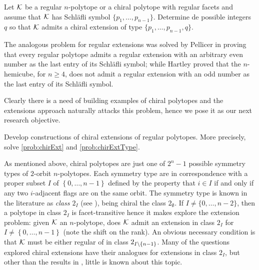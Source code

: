 \documentclass[a4paper,12pt,english]{article}
\begin{document}
\begin{problem} \label{prob:chirExtType}
  Let $\mathcal{K}$ be a regular $n$-polytope or a chiral polytope with regular facets and assume that $\mathcal{K}$ has Schläfli symbol $\{p_{1}, \dots, p_{n-1}\}$. Determine de possible integers $q$ so that $\mathcal{K}$ admits a chiral extension of type $\{p_{1}, \dots, p_{n-1}, q\}$.
\end{problem}


The analogous problem for regular extensions was solved by Pellicer in \cite{Pellicer2010_ExtensionsDuallyBipartite,Pellicer2009_ExtensionsRegularPolytopes} proving  that every regular polytope admits a regular extension with an arbitrary even number as the last entry of its Schläfli symbol; while Hartley proved that the $n$-hemicube, for $n \geq 4$, does not admit a regular extension with an odd number as the last entry of its Schläfli symbol.


Clearly there is a need of building examples of chiral polytopes and the extensions approach naturally attacks this problem, hence we pose it as our next research objective.

\begin{obj}\label{obj:chirExt}
  Develop constructions of chiral extensions of regular polytopes. 
  More precisely, solve \cref{prob:chirExt} and \cref{prob:chirExtType}.
\end{obj}

As mentioned above, chiral polytopes are just one of  $2^{n}-1$ possible symmetry types of $2$-orbit $n$-polytopes.
Each symmetry type are in correspondence with a proper subset $I$ of $\left\{ 0, \dots, n-1 \right\} $ defined by the property that $i \in I$ if and only if any two $i$-adjacent flags are on the same orbit.
The symmetry type is known in the literature as \emph{class $2_{I}$ } (see \cite{PellPotTol2019_ExistenceResultTwo,Matteo2016_TwoOrbitConvex,Hubard2010_TwoOrbitPolyhedra}), being chiral  the class $2_{\emptyset}$.
If $I \neq \{0, \dots, n-2\}$, then a polytope in class $2_{I} $ is facet-transitive hence it makes explore the extension problem: given $\mathcal{K}$ an $n$-polytope, does $\mathcal{K}$ admit an extension in class $2_{I}$ for $I \neq \left\{ 0, \dots, n-1 \right\} $ (note the shift on the rank).
An obvious necessary condition is that $\mathcal{K}$ must be either regular of in class $2_{I\setminus\left\{ n-1  \right\}}$.
Many of the questions explored chiral extensions have their analogues for extensions in class $2_{I}$, but other than the results in \cite{PellPotTol2019_ExistenceResultTwo}, little is known about this topic.
\end{document}
